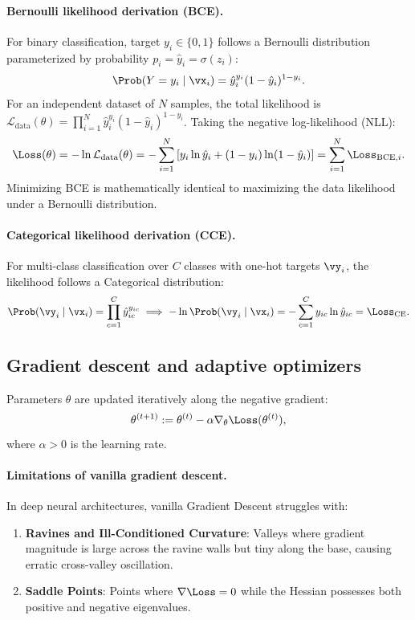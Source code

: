 \documentclass[../../main.tex]{subfiles}
\begin{document}
\paragraph{Bernoulli likelihood derivation (BCE).}
For binary classification, target $y_i \in \{0, 1\}$ follows a Bernoulli distribution parameterized by probability $p_i = \hat{y}_i = \sigma(z_i)$:
\begin{equation}
\Prob(Y = y_i \mid \vx_i) = \hat{y}_i^{y_i} (1 - \hat{y}_i)^{1 - y_i}.
\end{equation}
For an independent dataset of $N$ samples, the total likelihood is $\mathcal{L}_{\text{data}}(\theta) = \prod_{i=1}^N \hat{y}_i^{y_i} (1 - \hat{y}_i)^{1 - y_i}$. Taking the negative log-likelihood (NLL):
\begin{equation}
\Loss(\theta) = - \ln \mathcal{L}_{\text{data}}(\theta) = - \sum_{i=1}^N \left[ y_i \ln \hat{y}_i + (1 - y_i) \ln(1 - \hat{y}_i) \right] = \sum_{i=1}^N \Loss_{\text{BCE}, i}.
\end{equation}
Minimizing BCE is mathematically identical to maximizing the data likelihood under a Bernoulli distribution.

\paragraph{Categorical likelihood derivation (CCE).}
For multi-class classification over $C$ classes with one-hot targets $\vy_i$, the likelihood follows a Categorical distribution:
\begin{equation}
\Prob(\vy_i \mid \vx_i) = \prod_{c=1}^C \hat{y}_{ic}^{y_{ic}} \implies - \ln \Prob(\vy_i \mid \vx_i) = - \sum_{c=1}^C y_{ic} \ln \hat{y}_{ic} = \Loss_{\text{CE}}.
\end{equation}

\subsection{Gradient descent and adaptive optimizers}
Parameters $\theta$ are updated iteratively along the negative gradient:
\begin{equation}
\theta^{(t+1)} := \theta^{(t)} - \alpha \nabla_\theta \Loss(\theta^{(t)}),
\end{equation}
where $\alpha > 0$ is the learning rate.

\paragraph{Limitations of vanilla gradient descent.}
In deep neural architectures, vanilla Gradient Descent struggles with:
\begin{enumerate}
    \item \textbf{Ravines and Ill-Conditioned Curvature}: Valleys where gradient magnitude is large across the ravine walls but tiny along the base, causing erratic cross-valley oscillation.
    \item \textbf{Saddle Points}: Points where $\nabla \Loss = 0$ while the Hessian possesses both positive and negative eigenvalues.
\end{enumerate}
\end{document}
